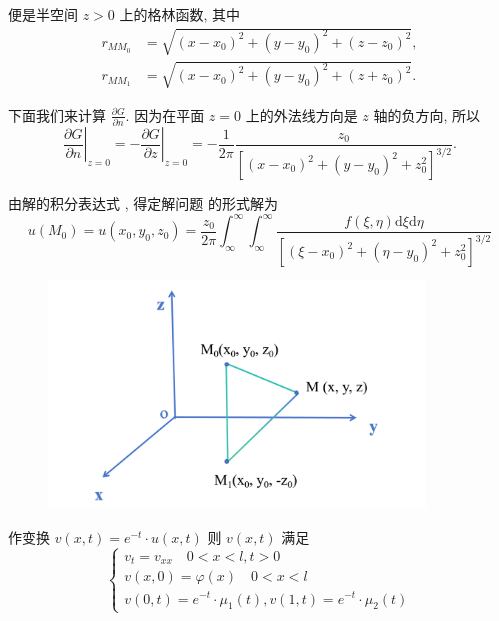 \begin{questions}
\begin{solution}
便是半空间 $ z>0 $ 上的格林函数, 其中
$$
\begin{aligned}
r_{M M_{0}} & =\sqrt{\left(x-x_{0}\right)^{2}+\left(y-y_{0}\right)^{2}+\left(z-z_{0}\right)^{2}}, \\
r_{M M_{1}} & =\sqrt{\left(x-x_{0}\right)^{2}+\left(y-y_{0}\right)^{2}+\left(z+z_{0}\right)^{2}} .
\end{aligned}
$$

下面我们来计算 $ \frac{\partial G}{\partial n} $. 因为在平面 $ z=0 $ 上的外法线方向是 $ z $ 轴的负方向, 所以
$$
\left.\frac{\partial G}{\partial n}\right|_{z=0}=-\left.\frac{\partial G}{\partial z}\right|_{z=0}=-\frac{1}{2 \pi} \frac{z_{0}}{\left[\left(x-x_{0}\right)^{2}+\left(y-y_{0}\right)^{2}+z_{0}^{2}\right]^{3 / 2}} .
$$

由解的积分表达式 , 得定解问题 的形式解为
$$
u\left(M_{0}\right)=u\left(x_{0}, y_{0}, z_{0}\right)=\frac{z_{0}}{2 \pi} \int_{\infty}^{\infty} \int_{\infty}^{\infty} \frac{f(\xi, \eta) \mathrm{d} \xi \mathrm{d} \eta}{\left[\left(\xi-x_{0}\right)^{2}+\left(\eta-y_{0}\right)^{2}+z_{0}^{2}\right]^{3 / 2}}
$$
\end{solution}
\begin{figure}[h]%
	\centering
	\includegraphics[width=10cm]{pic1.png}
\end{figure}
\begin{solution}
    作变换 $ v(x, t)=e^{-t} \cdot u(x, t) $ 则 $ v(x, t) $ 满足
$$
\left\{\begin{array}{l}
v_{t}=v_{x x} \quad 0 < x < l, t>0 \\
v(x, 0)=\varphi(x) \quad 0 < x < l \\
v(0, t)=e^{-t} \cdot \mu_{1}(t), v(1, t)=e^{-t} \cdot \mu_{2}(t)
\end{array}\right.
$$


\end{solution}
\end{questions}
